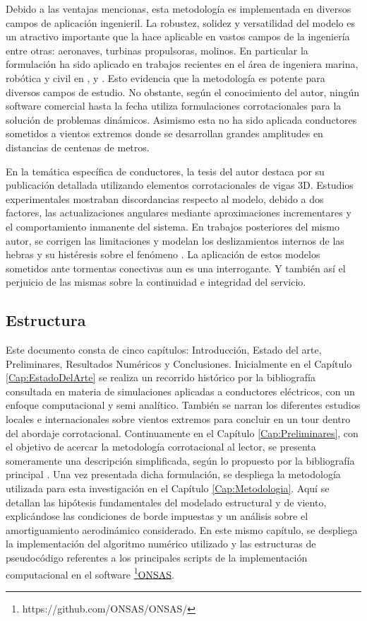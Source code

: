 Debido a las ventajas mencionas, esta metodología es implementada en diversos campos de aplicación ingenieril. La robustez, solidez y versatilidad del modelo es un atractivo importante que la hace aplicable en vastos campos de la ingeniería entre otras: aeronaves, turbinas propulsoras, molinos. En particular la formulación \citep{Le2014}  ha sido aplicado en trabajos recientes en el área de ingeniera marina, robótica y civil en \citep{albino2018co}, \cite{asadi2019multibody} y \cite{viana2020formulation}. Esto evidencia que la metodología es potente para diversos campos de estudio. No obstante, según el conocimiento del autor, ningún software comercial hasta la fecha utiliza formulaciones corrotacionales para la solución de problemas dinámicos. Asimismo esta no ha sido aplicada conductores sometidos a vientos extremos donde se desarrollan grandes amplitudes en distancias de centenas de metros.

En la temática específica de conductores, la tesis del autor \citet{foti2013corotational} destaca por su publicación detallada utilizando elementos corrotacionales de vigas 3D. Estudios experimentales mostraban discordancias respecto al modelo, debido a dos factores, las actualizaciones angulares mediante aproximaciones incrementares y el comportamiento inmanente del sistema. En trabajos posteriores del mismo autor, se corrigen las limitaciones y modelan los deslizamientos internos de las hebras y su histéresis sobre el fenómeno \citet{foti2018finite}. La aplicación de estos modelos sometidos ante tormentas conectivas aun es una interrogante. Y también así el perjuicio de las mismas sobre la continuidad e integridad del servicio. 

\subsection{Estructura}

 Este documento consta de cinco capítulos: Introducción, Estado del arte, Preliminares, Resultados Numéricos y Conclusiones. Inicialmente en el Capítulo \ref{Cap:EstadoDelArte} se realiza un recorrido histórico por la bibliografía consultada en materia de simulaciones aplicadas a conductores eléctricos, con un enfoque computacional y semi analítico. También se narran los diferentes estudios locales e internacionales sobre vientos extremos para concluir en un tour dentro del abordaje corrotacional. Continuamente en el Capítulo \ref{Cap:Preliminares}, con el objetivo de acercar la metodología corrotacional al lector, se presenta someramente una descripción simplificada, según lo propuesto por la bibliografía principal \citet{Le2014}. Una vez presentada dicha formulación, se despliega la metodología utilizada para esta investigación en el Capítulo \ref{Cap:Metodologia}. Aquí se detallan las hipótesis fundamentales del modelado estructural y de viento, explicándose las condiciones de borde impuestas y un análisis sobre el amortiguamiento aerodinámico considerado. En este mismo capítulo, se despliega la implementación del algoritmo numérico utilizado y las estructuras de pseudocódigo referentes a los principales scripts de la implementación computacional en el software \footnote{https://github.com/ONSAS/ONSAS/}\href{https://github.com/ONSAS/ONSAS/}{ONSAS}. 
 
